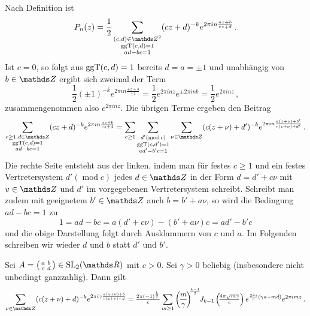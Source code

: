 \begin{bewe}
Nach Definition ist 
\[
	P_n(z) = \frac 12 \sum_{\substack{(c,d)\in\ZZ^2 \\ \ggt(c,d) = 1 \\ ad-bc = 1}} (cz+d)^{-k} e^{2\pi in \frac{az+b}{cz+d}}
	\,.
\]
Ist $c = 0$, so folgt aus $\operatorname{ggT}(c,d) = 1$ bereits $d = a = \pm 1$ und unabhängig von $b \in \ZZ$ ergibt sich zweimal der Term
\[
	\frac 12 (\pm 1)^{-k} e^{2\pi in \frac{\pm z + b}{\pm 1}} = \frac 12 e^{2\pi in z} e^{\pm 2\pi in b} = \frac 12 e^{2 \pi inz}
	\,,
\]
zusammengenommen also $e^{2 \pi inz}$. Die übrigen Terme ergeben den Beitrag 
\[
	\sum_{\substack{c \geq 1, d \in \ZZ \\ \ggt(c,d) = 1 \\ ad-bc = 1}} (cz+d)^{-k} e^{2 \pi i n \frac{az+b}{cz+d}} = \sum_{c \geq 1} \sum_{\substack{d' (\operatorname{mod} c) \\ \ggt(c,d') = 1 \\ ad'-b'c = 1}} \sum_{\nu \in \ZZ} (c(z + \nu) +d')^{-k} e^{2\pi in \frac{a(z+\nu)+b'}{c(z+\nu)+d'}}
	\,.
\]
Die rechte Seite entsteht aus der linken, indem man für festes $c \geq 1$ und ein festes Vertretersystem $d' (\operatorname{mod} c)$ jedes $d \in \ZZ$ in der Form $d = d' + c\nu$ mit $v \in \ZZ$ und $d'$ im vorgegebenen Vertretersystem schreibt. Schreibt man zudem mit geeignetem $b' \in \ZZ$ auch $b = b' + a\nu$, so wird die Bedingung $ad - bc = 1$ zu
\[
	1 = ad - bc = a(d' + c\nu) - (b' + a\nu)c = ad' - b'c
\]
und die obige Darstellung folgt durch Ausklammern von $c$ und $a$. Im Folgenden schreiben wir wieder $d$ und $b$ statt $d'$ und $b'$.

\begin{lemm}
Sei $A = \mymat abcd \in \SL_2(\RR)$ mit $c > 0$. Sei $\gamma > 0$ beliebig (insbesondere nicht unbedingt ganzzahlig). Dann gilt
\[
	\sum_{\nu \in \ZZ} (c(z + \nu) +d)^{-k} e^{2\pi i\gamma \frac{a(z+\nu)+b}{c(z+\nu)+d}} 
	= 
	\tfrac{2\pi (-1)^{\frac k2}}c \sum_{m \geq 1} \left(\!\frac m\gamma\!\right)^{\!\!\frac{k-1}2} \!\! J_{k-1}\left(\!\tfrac{4\pi\sqrt{m\gamma}}c\right) e^{\frac{2\pi i}c (\gamma a + md)} e^{2\pi imz}
	\,.
\]
\end{lemm}


\end{bewe}

